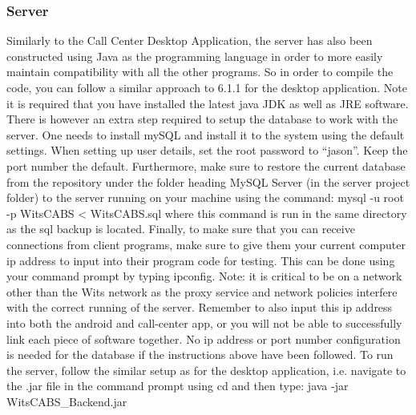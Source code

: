 \documentclass[a4paper,12pt]{article}
\begin{document}
\subsubsection{Server}
Similarly to the Call Center Desktop Application, the server has also been constructed using Java as the programming language in order to more easily maintain compatibility with all the other programs. So in order to compile the code, you can follow a similar approach to 6.1.1 for the desktop application. Note it is required that you have installed the latest java JDK as well as JRE software. There is however an extra step required to setup the database to work with the server. One needs to install mySQL and install it to the system using the default settings. When setting up user details, set the root password to ``jason''. Keep the port number the default. Furthermore, make sure to restore the current database from the repository under the folder heading MySQL Server (in the server project folder) to the server running on your machine using the command: mysql -u root -p WitsCABS < WitsCABS.sql where this command is run in the same directory as the sql backup is located. Finally, to make sure that you can receive connections from client programs, make sure to give them your current computer ip address to input into their program code for testing. This can be done using your command prompt by typing ipconfig. Note: it is critical to be on a network other than the Wits network as the proxy service and network policies interfere with the correct running of the server. Remember to also input this ip address into both the android and call-center app, or you will not be able to successfully link each piece of software together. No ip address or port number configuration is needed for the database if the instructions above have been followed.
To run the server, follow the similar setup as for the desktop application, i.e. navigate to the .jar file in the command prompt using cd and then type: java -jar WitsCABS\_Backend.jar

\newpage
\end{document}
